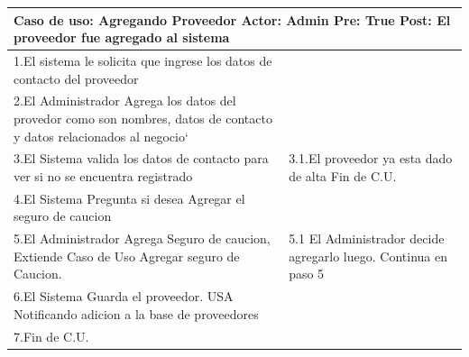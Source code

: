 \begin{longtable}{| p{} | p{} |} 
    \hline
    \multicolumn{2}{|p{16cm}|}{
        \textbf{Caso de uso:} Agregando Proveedor \newline
        \textbf{Actor:} Admin\newline
        \textbf{Pre:}  True\newline
        \textbf{Post:} El proveedor fue agregado al sistema
    }\\
    \hline
    1.El sistema le solicita que ingrese los datos de contacto del proveedor & \\
    \hline
    2.El Administrador Agrega los datos del provedor como son nombres, datos de contacto y datos relacionados al negocio` &  \\
    \hline
    3.El Sistema valida los datos de contacto para ver si no se encuentra registrado & 3.1.El proveedor ya esta dado de alta \newline 3.2 Fin de C.U.  \\
    \hline
    4.El Sistema Pregunta si desea Agregar el seguro de caucion&\\
    \hline
    5.El Administrador Agrega Seguro de caucion, Extiende Caso de Uso Agregar seguro de Caucion. & 5.1 El Administrador decide agregarlo luego. Continua en paso 5 \\
    \hline
    6.El Sistema Guarda el proveedor. USA Notificando adicion a la base de proveedores& \\
    \hline
    7.Fin de C.U.& \\
    \hline
\end{longtable}

